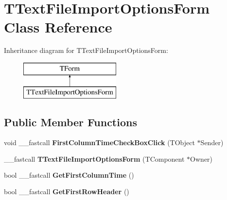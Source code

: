 \hypertarget{class_t_text_file_import_options_form}{\section{T\+Text\+File\+Import\+Options\+Form Class Reference}
\label{class_t_text_file_import_options_form}
}
Inheritance diagram for T\+Text\+File\+Import\+Options\+Form\+:\begin{figure}[H]
\begin{center}
\leavevmode
\includegraphics[height=2.000000cm]{class_t_text_file_import_options_form}
\end{center}
\end{figure}
\subsection*{Public Member Functions}
\begin{DoxyCompactItemize}
\item 
\hypertarget{class_t_text_file_import_options_form_a2bc5768b15fca4a9dd569b437de33e93}{void \+\_\+\+\_\+fastcall {\bfseries First\+Column\+Time\+Check\+Box\+Click} (T\+Object $\ast$Sender)}\label{class_t_text_file_import_options_form_a2bc5768b15fca4a9dd569b437de33e93}

\item 
\hypertarget{class_t_text_file_import_options_form_aaa7a17780481bfc3bb086fe938a5a8ab}{\+\_\+\+\_\+fastcall {\bfseries T\+Text\+File\+Import\+Options\+Form} (T\+Component $\ast$Owner)}\label{class_t_text_file_import_options_form_aaa7a17780481bfc3bb086fe938a5a8ab}

\item 
\hypertarget{class_t_text_file_import_options_form_a2613b5976ec0f15f5c5d205955316b00}{bool \+\_\+\+\_\+fastcall {\bfseries Get\+First\+Column\+Time} ()}\label{class_t_text_file_import_options_form_a2613b5976ec0f15f5c5d205955316b00}

\item 
\hypertarget{class_t_text_file_import_options_form_adc875c9fcfbf8fc8ae0fb39f983f1245}{bool \+\_\+\+\_\+fastcall {\bfseries Get\+First\+Row\+Header} ()}\label{class_t_text_file_import_options_form_adc875c9fcfbf8fc8ae0fb39f983f1245}

\end{DoxyCompactItemize}
